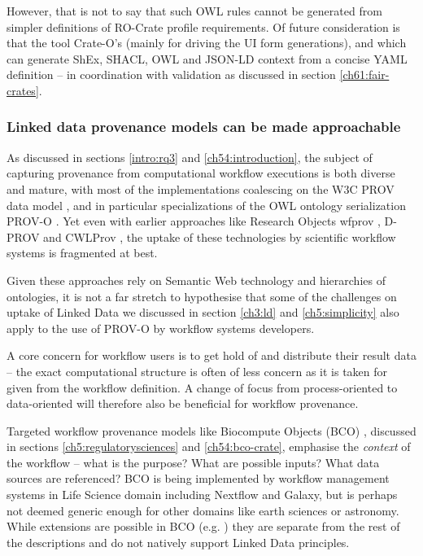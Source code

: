 However, that is not to say that such OWL rules cannot be generated from simpler definitions of RO-Crate profile requirements. Of future consideration is that the tool Crate-O's   (mainly for driving the UI form generations), and  which can generate ShEx, SHACL, OWL and JSON-LD context from a concise YAML definition -- in coordination with validation as discussed in section \vref{ch61:fair-crates}.




\subsubsection{Linked data provenance models can be made approachable}

As discussed in sections \vref{intro:rq3} and \vref{ch54:introduction}, the subject of capturing provenance from computational workflow executions is both diverse and mature, with most of the implementations coalescing on the W3C PROV data model \cite{Moreau 2013}, and in particular specializations of the OWL ontology serialization PROV-O \cite{Lebo 2013a}. Yet even with earlier approaches like Research Objects wfprov \cite{Belhajjame 2015}, D-PROV \cite{Missier 2013} and CWLProv \cite{Khan 2019}, the uptake of these technologies by scientific workflow systems is fragmented at best.

Given these approaches rely on Semantic Web technology and hierarchies of ontologies, it is not a far stretch to hypothesise that some of the challenges on uptake of Linked Data we discussed in section \vref{ch3:ld} and \vref{ch5:simplicity} also apply to the use of PROV-O by workflow systems developers. 

A core concern for workflow users is to get hold of and distribute their result data -- the exact computational structure is often of less concern as it is taken for given from the workflow definition. A change of focus from process-oriented to data-oriented will therefore also be beneficial for workflow provenance. 

Targeted workflow provenance models like Biocompute Objects (BCO) \cite{IEEE 2791-2020,Alterovitz 2018}, discussed in sections \vref{ch5:regulatorysciences} and \vref{ch54:bco-crate}, emphasise the \emph{context} of the workflow -- what is the purpose? What are possible inputs? What data sources are referenced?  BCO is being implemented by workflow management systems in Life Science domain including Nextflow and Galaxy, but is perhaps not deemed generic enough for other domains like earth sciences or astronomy.  While extensions are possible in BCO (e.g. ) they are separate from the rest of the descriptions and do not natively support Linked Data principles.

